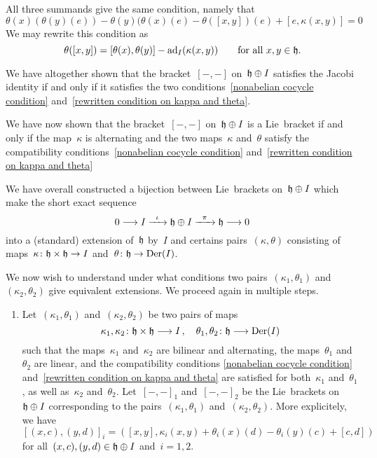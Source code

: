 \begin{fluff}
\begin{enumerate}
\begin{itemize*}
          All three summands give the same condition, namely that
          \[
            \theta(x)( \theta(y)(e) )
            -
            \theta(y)( \theta(x)(e)
            -
            \theta([x,y])(e)
            +
            [e, \kappa(x,y)]
            =
            0
          \]
          We may rewrite this condition as
          \begin{equation}
            \label{rewritten condition on kappa and theta}
            \theta([x,y])
            =
            [\theta(x), \theta(y)]
            -
            \operatorname{ad}_I( \kappa(x,y) )
            \qquad
            \text{for all~$x, y \in \mathfrak{h}$.}
          \end{equation}
      \end{itemize*}
      We have altogether shown that the bracket~$[-,-]$ on~$\mathfrak{h} \oplus I$ satisfies the Jacobi identity if and only if it satisfies the two conditions~\eqref{nonabelian cocycle condition} and~\eqref{rewritten condition on kappa and theta}.

      We have now shown that the bracket~$[-,-]$ on~$\mathfrak{h} \oplus I$ is a Lie~bracket if and only if the map~$\kappa$ is alternating and the two maps~$\kappa$ and~$\theta$ satisfy the compatibility conditions~\eqref{nonabelian cocycle condition} and~\eqref{rewritten condition on kappa and theta}
  \end{enumerate}
  We have overall constructed a bijection between Lie~brackets on~$\mathfrak{h} \oplus I$ which make the short exact sequence
  \[
    0
    \to
    I
    \xto{\iota}
    \hlie \oplus I
    \xto{\pi}
    \hlie
    \to
    0
  \]
  into a (standard) extension of~$\mathfrak{h}$ by~$I$ and certains pairs~$(\kappa, \theta)$ consisting of maps~$\kappa \colon \hlie \times \hlie \to I$ and~$\theta \colon \hlie \to \Der(I)$.

  We now wish to understand under what conditions two pairs~$(\kappa_1, \theta_1)$ and~$(\kappa_2, \theta_2)$ give equivalent extensions.
  We proceed again in multiple steps.
  \begin{enumerate}[resume*]
    \item
      Let~$(\kappa_1, \theta_1)$ and~$(\kappa_2, \theta_2)$ be two pairs of maps
      \[
        \kappa_1, \kappa_2
        \colon
        \hlie \times \hlie
        \to
        I \,,
        \quad
        \theta_1, \theta_2
        \colon
        \hlie
        \to
        \Der(I)
      \]
      such that the maps~$\kappa_1$ and~$\kappa_2$ are bilinear and alternating, the maps~$\theta_1$ and~$\theta_2$ are linear, and the compatibility conditions \eqref{nonabelian cocycle condition} and~\eqref{rewritten condition on kappa and theta} are satisfied for both~$\kappa_1$ and~$\theta_1$, as well as~$\kappa_2$ and~$\theta_2$.
      Let~$[-,-]_1$ and~$[-,-]_2$ be the Lie~brackets on~$\mathfrak{h} \oplus I$ corresponding to the pairs~$(\kappa_1, \theta_1)$ and~$(\kappa_2, \theta_2)$.
      More explicitely, we have
      \[
        [(x,c), (y,d)]_i
        =
        (
          [x,y],
          \kappa_i(x,y) + \theta_i(x)(d) - \theta_i(y)(c) + [c,d]
        )
      \]
      for all~$(x,c), (y,d) \in \mathfrak{h} \oplus I$ and~$i = 1, 2$.


\end{enumerate}
\end{fluff}
